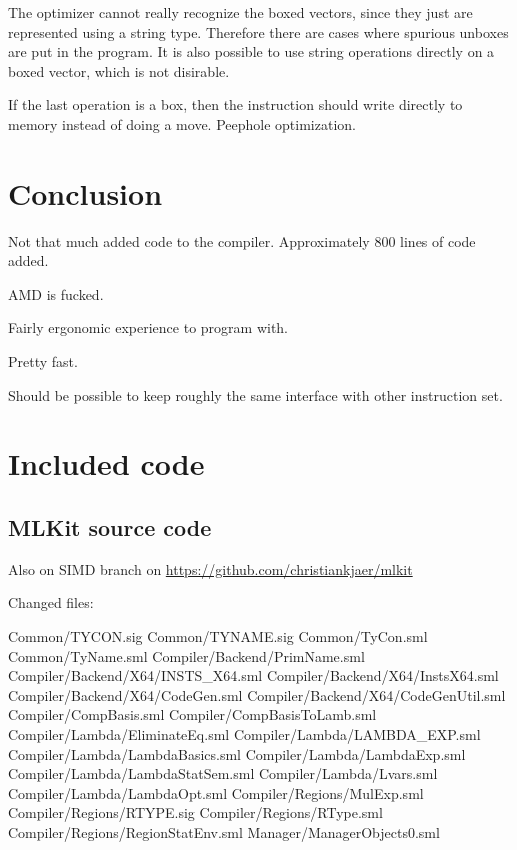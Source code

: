 \documentclass{article}
\begin{document}
The optimizer cannot really recognize the boxed vectors, since they just are represented using a string type. Therefore there are cases where spurious unboxes are put in the program. It is also possible to use string operations directly on a boxed vector, which is not disirable.

If the last operation is a box, then the instruction should write directly to memory instead of doing a move. Peephole optimization.

\section{Conclusion}

Not that much added code to the compiler. Approximately 800 lines of code added.

AMD is fucked.

Fairly ergonomic experience to program with.

Pretty fast.

Should be possible to keep roughly the same interface with other instruction set.






\appendix

\section{Included code}

\subsection{MLKit source code}

Also on SIMD branch on 
\url{https://github.com/christiankjaer/mlkit}

Changed files:

Common/TYCON.sig
Common/TYNAME.sig
Common/TyCon.sml
Common/TyName.sml
Compiler/Backend/PrimName.sml
Compiler/Backend/X64/INSTS\_X64.sml
Compiler/Backend/X64/InstsX64.sml
Compiler/Backend/X64/CodeGen.sml
Compiler/Backend/X64/CodeGenUtil.sml
Compiler/CompBasis.sml
Compiler/CompBasisToLamb.sml
Compiler/Lambda/EliminateEq.sml
Compiler/Lambda/LAMBDA\_EXP.sml
Compiler/Lambda/LambdaBasics.sml
Compiler/Lambda/LambdaExp.sml
Compiler/Lambda/LambdaStatSem.sml
Compiler/Lambda/Lvars.sml
Compiler/Lambda/LambdaOpt.sml
Compiler/Regions/MulExp.sml
Compiler/Regions/RTYPE.sig
Compiler/Regions/RType.sml
Compiler/Regions/RegionStatEnv.sml
Manager/ManagerObjects0.sml
\end{document}

